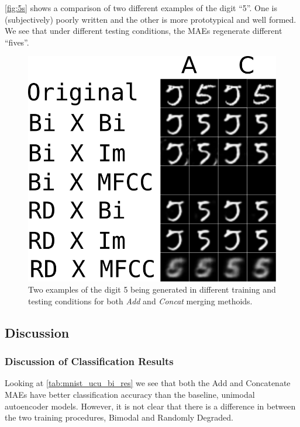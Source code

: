\autoref{fig:5s} shows a comparison of two different examples of the digit ``5''. One is (subjectively) poorly written and the other is more prototypical and well formed. We see that under different testing conditions, the MAEs regenerate different ``fives''.
\begin{figure}
\begin{center}
	\includegraphics{Figs/mnistSpoken/5s.png}
	\caption{Two examples of the digit 5 being generated in different training and testing conditions for both \textit{Add} and \textit{Concat} merging methoids.}
	\label{fig:5s}
\end{center}
\end{figure}



\subsection{Discussion}

\subsubsection{Discussion of Classification Results}
Looking at \autoref{tab:mnist_ucu_bi_res} we see that both the Add and Concatenate MAEs have better classification accuracy than the baseline, unimodal autoencoder models. However, it is not clear that there is a difference in between the two training procedures, Bimodal and Randomly Degraded.

